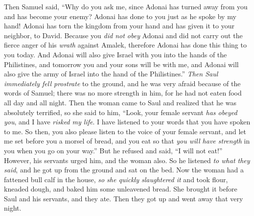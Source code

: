 \begin{biblechapter}
\verse Then Samuel said, “Why do you ask me, since Adonai has turned away from you and has become your enemy?
\verse Adonai has done to you just as he spoke by my hand! Adonai has torn the kingdom from your hand and has given it to your neighbor, to David.
\verse Because you \textit{did not obey} Adonai and did not carry out the fierce anger of his \textit{wrath} against Amalek, therefore Adonai has done this thing to you today.
\verse And Adonai will also give Israel with you into the hands of the Philistines, and tomorrow you and your sons will be with me, and Adonai will also give the army of Israel into the hand of the Philistines.”
\verse \textit{Then Saul immediately fell prostrate} to the ground, and he was very afraid because of the words of Samuel; there was no more strength in him, for he had not eaten food all day and all night.
\verse Then the woman came to Saul and realized that he was absolutely terrified, so she said to him, “Look, your female servant \textit{has obeyed you}, and I have \textit{risked my life}. I have listened to your words that you have spoken to me.
\verse So then, you also please listen to the voice of your female servant, and let me set before you a morsel of bread, and you eat so that \textit{you will have strength} in you when you go on your way.”
\verse But he refused and said, “I will not eat!” However, his servants urged him, and the woman also. So he listened \textit{to what they said}, and he got up from the ground and sat on the bed.
\verse Now the woman had a fattened bull calf in the house, \textit{so she quickly slaughtered it} and took flour, kneaded dough, and baked him some unleavened bread.
\verse She brought it before Saul and his servants, and they ate. Then they got up and went away that very night.
\end{biblechapter}

